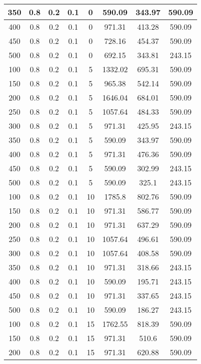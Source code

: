 \documentclass[a4paper, 12pt]{extreport}
\begin{document}
\begin{itemize}
\begin{longtable}{|c|c|c|c|c|c|c|c|}
			350 & 0.8 & 0.2 & 0.1 & 0 & 590.09 & 343.97 & 590.09 \\\hline
			400 & 0.8 & 0.2 & 0.1 & 0 & 971.31 & 413.28 & 590.09 \\\hline
			450 & 0.8 & 0.2 & 0.1 & 0 & 728.16 & 454.37 & 590.09 \\\hline
			500 & 0.8 & 0.2 & 0.1 & 0 & 692.15 & 343.81 & 243.15 \\\hline
			100 & 0.8 & 0.2 & 0.1 & 5 & 1332.02 & 695.31 & 590.09 \\\hline
			150 & 0.8 & 0.2 & 0.1 & 5 & 965.38 & 542.14 & 590.09 \\\hline
			200 & 0.8 & 0.2 & 0.1 & 5 & 1646.04 & 684.01 & 590.09 \\\hline
			250 & 0.8 & 0.2 & 0.1 & 5 & 1057.64 & 484.33 & 590.09 \\\hline
			300 & 0.8 & 0.2 & 0.1 & 5 & 971.31 & 425.95 & 243.15 \\\hline
			350 & 0.8 & 0.2 & 0.1 & 5 & 590.09 & 343.97 & 590.09 \\\hline
			400 & 0.8 & 0.2 & 0.1 & 5 & 971.31 & 476.36 & 590.09 \\\hline
			450 & 0.8 & 0.2 & 0.1 & 5 & 590.09 & 302.99 & 243.15 \\\hline
			500 & 0.8 & 0.2 & 0.1 & 5 & 590.09 & 325.1 & 243.15 \\\hline
			100 & 0.8 & 0.2 & 0.1 & 10 & 1785.8 & 802.76 & 590.09 \\\hline
			150 & 0.8 & 0.2 & 0.1 & 10 & 971.31 & 586.77 & 590.09 \\\hline
			200 & 0.8 & 0.2 & 0.1 & 10 & 971.31 & 637.29 & 590.09 \\\hline
			250 & 0.8 & 0.2 & 0.1 & 10 & 1057.64 & 496.61 & 590.09 \\\hline
			300 & 0.8 & 0.2 & 0.1 & 10 & 1057.64 & 408.58 & 590.09 \\\hline
			350 & 0.8 & 0.2 & 0.1 & 10 & 971.31 & 318.66 & 243.15 \\\hline
			400 & 0.8 & 0.2 & 0.1 & 10 & 590.09 & 195.71 & 243.15 \\\hline
			450 & 0.8 & 0.2 & 0.1 & 10 & 971.31 & 337.65 & 243.15 \\\hline
			500 & 0.8 & 0.2 & 0.1 & 10 & 590.09 & 186.27 & 243.15 \\\hline
			100 & 0.8 & 0.2 & 0.1 & 15 & 1762.55 & 818.39 & 590.09 \\\hline
			150 & 0.8 & 0.2 & 0.1 & 15 & 971.31 & 510.6 & 590.09 \\\hline
			200 & 0.8 & 0.2 & 0.1 & 15 & 971.31 & 620.88 & 590.09 \\\hline

\end{longtable}
\end{itemize}
\end{document}
